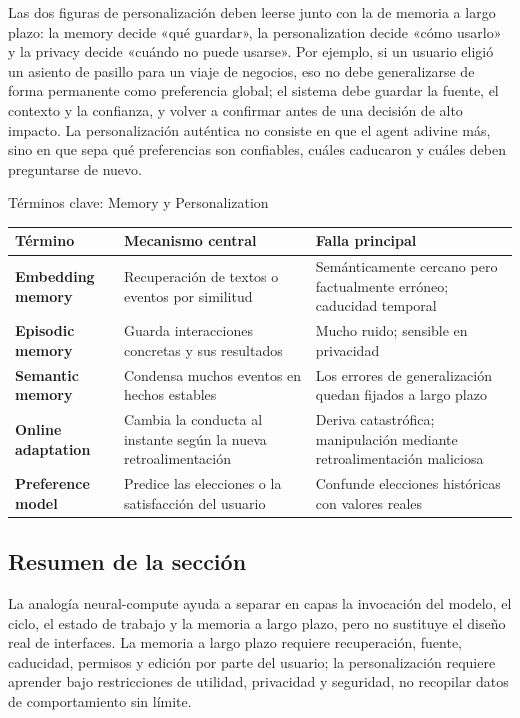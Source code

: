 Las dos figuras de personalización deben leerse junto con la de memoria a largo plazo: la memory decide «qué guardar», la personalization decide «cómo usarlo» y la privacy decide «cuándo no puede usarse». Por ejemplo, si un usuario eligió un asiento de pasillo para un viaje de negocios, eso no debe generalizarse de forma permanente como preferencia global; el sistema debe guardar la fuente, el contexto y la confianza, y volver a confirmar antes de una decisión de alto impacto. La personalización auténtica no consiste en que el agent adivine más, sino en que sepa qué preferencias son confiables, cuáles caducaron y cuáles deben preguntarse de nuevo.


\begin{knowledgebox}{Términos clave: Memory y Personalization}
\begin{tabularx}{\textwidth}{>{\bfseries}p{} X X}
Término & Mecanismo central & Falla principal \\
\hline
Embedding memory & Recuperación de textos o eventos por similitud & Semánticamente cercano pero factualmente erróneo; caducidad temporal \\
Episodic memory & Guarda interacciones concretas y sus resultados & Mucho ruido; sensible en privacidad \\
Semantic memory & Condensa muchos eventos en hechos estables & Los errores de generalización quedan fijados a largo plazo \\
Online adaptation & Cambia la conducta al instante según la nueva retroalimentación & Deriva catastrófica; manipulación mediante retroalimentación maliciosa \\
Preference model & Predice las elecciones o la satisfacción del usuario & Confunde elecciones históricas con valores reales \\
\end{tabularx}
\end{knowledgebox}

\subsection{Resumen de la sección}

La analogía neural-compute ayuda a separar en capas la invocación del modelo, el ciclo, el estado de trabajo y la memoria a largo plazo, pero no sustituye el diseño real de interfaces. La memoria a largo plazo requiere recuperación, fuente, caducidad, permisos y edición por parte del usuario; la personalización requiere aprender bajo restricciones de utilidad, privacidad y seguridad, no recopilar datos de comportamiento sin límite.

